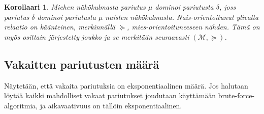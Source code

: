 \documentclass[finnish]{tktltiki2}
\newtheorem{kor}[lau]{Korollaari}
\theoremstyle{definition}
\theoremstyle{remark}
\begin{document}
\begin{kor}
Miehen näkökulmasta pariutus $\mu$ dominoi pariutusta $\delta$, joss pariutus $\delta$ dominoi pariutusta $\mu$ naisten näkökulmasta. \emph{Nais-orientoitunut} ylivalta relaatio on käänteinen, merkinnällä $\succeq$, mies-orientoituneeseen nähden. Tämä on myös osittain järjestetty joukko ja se merkitään seuraavasti $(\mathcal{M}, \succeq)$. 
\end{kor}

\subsection{Vakaitten pariutusten määrä}
Näytetään, että vakaita pariutuksia on eksponentiaalinen määrä. Jos halutaan löytää kaikki mahdolliset vakaat pariutukset joudutaan käyttämään brute-force-algoritmia, ja aikavaativuus on tällöin eksponentiaalinen.
\end{document}
